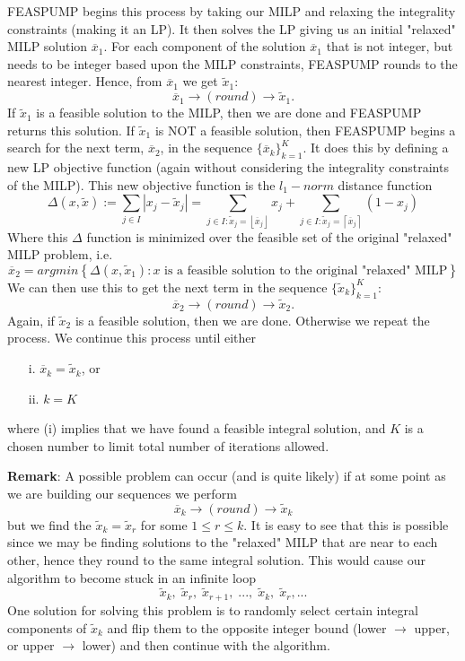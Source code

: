 \documentclass{article}
\begin{document}
\begin{itemize}
FEASPUMP begins this process by taking our MILP and relaxing the integrality constraints (making it an LP). It then solves the LP giving us an initial "relaxed" MILP solution $\overline{x}_1$. For each component of the solution $\overline{x}_1$ that is not integer, but needs to be integer based upon the MILP constraints, FEASPUMP rounds to the nearest integer. Hence, from $\overline{x}_1$ we get $\tilde{x}_1$:
\[
\overline{x}_1 \rightarrow (round) \rightarrow \tilde{x}_1.
\]  
If $\tilde{x}_1$ is a feasible solution to the MILP, then we are done and FEASPUMP returns this solution. If $\tilde{x}_1$ is NOT a feasible solution, then FEASPUMP begins a search for the next term, $\overline{x}_2$, in the sequence $\{\overline{x}_k\}_{k=1}^K$. It does this by defining a new LP objective function (again without considering the integrality constraints of the MILP). This new objective function is the $l_1-norm$ distance function
\[
\Delta (x,\tilde{x}) := \sum\limits_{j\in I}|x_j-\tilde{x}_j| = \sum\limits_{j\in I:\tilde{x}_j = \left \lfloor{\overline{x}_j}\right \rfloor}x_j
+ \sum\limits_{j\in I:\tilde{x}_j = \left \lceil{\overline{x}_j}\right \rceil}(1-x_j)
\] 
Where this $\Delta$ function is minimized over the feasible set of the original "relaxed" MILP problem, i.e.
\[
\overline{x}_2 = argmin\left\lbrace\Delta(x,\tilde{x}_1): x \text{ is a feasible solution to the original "relaxed" MILP}\right\rbrace
\]
We can then use this to get the next term in the sequence $\{\tilde{x}_k\}_{k=1}^K$:
\[
\overline{x}_2 \rightarrow (round) \rightarrow \tilde{x}_2.
\]  
Again, if $\tilde{x}_2$ is a feasible solution, then we are done. Otherwise we repeat the process. We continue this process until either 
\begin{itemize}
\item[i.] $\overline{x}_k = \tilde{x}_k$, or
\item[ii.] $k=K$
\end{itemize}
where (i) implies that we have found a feasible integral solution, and $K$ is a chosen number to limit total number of iterations allowed. 
\vspace{.2in}

\textbf{Remark}: A possible problem can occur (and is quite likely) if at some point as we are building our sequences we perform
\[
\overline{x}_k \rightarrow (round) \rightarrow \tilde{x}_k
\]
but we find the $\tilde{x}_k = \tilde{x}_r$ for some $1\leq r \leq k$. It is easy to see that this is possible since we may be finding solutions to the "relaxed" MILP that are near to each other, hence they round to the same integral solution. This would cause our algorithm to become stuck in an infinite loop 
\[
\tilde{x}_k,\;\tilde{x}_r,\; \tilde{x}_{r+1},\;...,\;\tilde{x}_k,\;\tilde{x}_r,...
\]
One solution for solving this problem is to randomly select certain integral components of $\tilde{x}_k$ and flip them to the opposite integer bound (lower $\rightarrow$ upper, or upper $\rightarrow$ lower) and then continue with the algorithm. 


\end{itemize}
\end{document}
